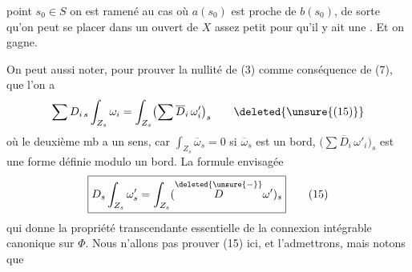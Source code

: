 point $s_0\in S$ on est ramené  au cas où $a(s_0)$ est proche de $b(s_0)$, de sorte qu'on peut  se placer dans un ouvert de $X$ assez petit pour qu'il y ait une . Et on gagne.

On peut aussi noter,  pour prouver la  nullité de (3) comme conséquence de (7), que l'on a
\[
 \sum D_{i\,s}\int_{Z_s}\omega_i
 =\int_{Z_s}\bigl(\sum\overline D_i\,\omega'_i\bigr)_s
 \tag*{\deleted{\unsure{(15)}}}
\]
où le deuxième mb a un sens, car $\int_{Z_s}\overline\omega_s=0$ si $\overline\omega_s$ est un bord,  $\bigl(\sum\overline D_i\,\omega'_i\bigr)_s$ est une forme définie modulo un bord. La formule envisagée  
\[
 \boxed{D_s\int_{Z_s}\omega'_s=\int_{Z_s}(\overset{\deleted{\unsure{-}}}{D}\omega')_s}
 \tag*{(15)}
\]
qui donne la propriété transcendante essentielle de la connexion intégrable canonique sur $\Phi$. Nous n'allons pas prouver (15) ici, et l'admettrons, mais notons que
